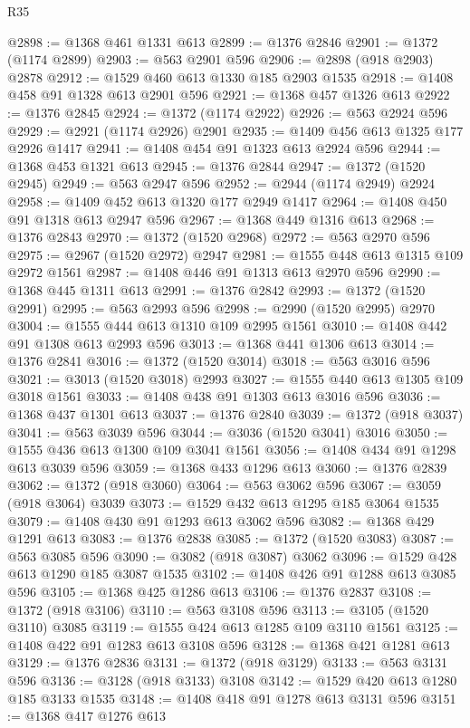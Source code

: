 \begin{lexlean}{R35}
\begin{coremodule}
@2898 := @1368 @461 @1331 @613
@2899 := @1376 @2846
@2901 := @1372 (@1174 @2899)
@2903 := @563 @2901 @596
@2906 := @2898 (@918 @2903) @2878
@2912 := @1529 @460 @613 @1330 @185 @2903 @1535
@2918 := @1408 @458 @91 @1328 @613 @2901 @596
@2921 := @1368 @457 @1326 @613
@2922 := @1376 @2845
@2924 := @1372 (@1174 @2922)
@2926 := @563 @2924 @596
@2929 := @2921 (@1174 @2926) @2901
@2935 := @1409 @456 @613 @1325 @177 @2926 @1417
@2941 := @1408 @454 @91 @1323 @613 @2924 @596
@2944 := @1368 @453 @1321 @613
@2945 := @1376 @2844
@2947 := @1372 (@1520 @2945)
@2949 := @563 @2947 @596
@2952 := @2944 (@1174 @2949) @2924
@2958 := @1409 @452 @613 @1320 @177 @2949 @1417
@2964 := @1408 @450 @91 @1318 @613 @2947 @596
@2967 := @1368 @449 @1316 @613
@2968 := @1376 @2843
@2970 := @1372 (@1520 @2968)
@2972 := @563 @2970 @596
@2975 := @2967 (@1520 @2972) @2947
@2981 := @1555 @448 @613 @1315 @109 @2972 @1561
@2987 := @1408 @446 @91 @1313 @613 @2970 @596
@2990 := @1368 @445 @1311 @613
@2991 := @1376 @2842
@2993 := @1372 (@1520 @2991)
@2995 := @563 @2993 @596
@2998 := @2990 (@1520 @2995) @2970
@3004 := @1555 @444 @613 @1310 @109 @2995 @1561
@3010 := @1408 @442 @91 @1308 @613 @2993 @596
@3013 := @1368 @441 @1306 @613
@3014 := @1376 @2841
@3016 := @1372 (@1520 @3014)
@3018 := @563 @3016 @596
@3021 := @3013 (@1520 @3018) @2993
@3027 := @1555 @440 @613 @1305 @109 @3018 @1561
@3033 := @1408 @438 @91 @1303 @613 @3016 @596
@3036 := @1368 @437 @1301 @613
@3037 := @1376 @2840
@3039 := @1372 (@918 @3037)
@3041 := @563 @3039 @596
@3044 := @3036 (@1520 @3041) @3016
@3050 := @1555 @436 @613 @1300 @109 @3041 @1561
@3056 := @1408 @434 @91 @1298 @613 @3039 @596
@3059 := @1368 @433 @1296 @613
@3060 := @1376 @2839
@3062 := @1372 (@918 @3060)
@3064 := @563 @3062 @596
@3067 := @3059 (@918 @3064) @3039
@3073 := @1529 @432 @613 @1295 @185 @3064 @1535
@3079 := @1408 @430 @91 @1293 @613 @3062 @596
@3082 := @1368 @429 @1291 @613
@3083 := @1376 @2838
@3085 := @1372 (@1520 @3083)
@3087 := @563 @3085 @596
@3090 := @3082 (@918 @3087) @3062
@3096 := @1529 @428 @613 @1290 @185 @3087 @1535
@3102 := @1408 @426 @91 @1288 @613 @3085 @596
@3105 := @1368 @425 @1286 @613
@3106 := @1376 @2837
@3108 := @1372 (@918 @3106)
@3110 := @563 @3108 @596
@3113 := @3105 (@1520 @3110) @3085
@3119 := @1555 @424 @613 @1285 @109 @3110 @1561
@3125 := @1408 @422 @91 @1283 @613 @3108 @596
@3128 := @1368 @421 @1281 @613
@3129 := @1376 @2836
@3131 := @1372 (@918 @3129)
@3133 := @563 @3131 @596
@3136 := @3128 (@918 @3133) @3108
@3142 := @1529 @420 @613 @1280 @185 @3133 @1535
@3148 := @1408 @418 @91 @1278 @613 @3131 @596
@3151 := @1368 @417 @1276 @613

\end{coremodule}
\end{lexlean}
